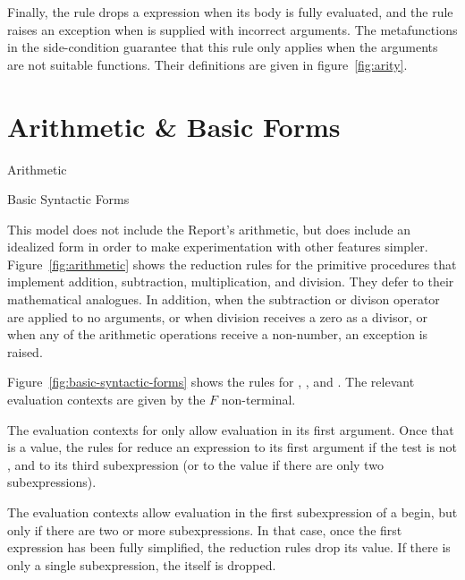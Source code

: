 Finally, the rule  drops a  expression
when its body is fully evaluated, and the rule 
raises an exception when  is supplied with
incorrect arguments.  The metafunctions in the side-condition
guarantee that this rule only applies when the arguments are not
suitable functions. Their definitions are given in
figure~\ref{fig:arity}.

\section{Arithmetic \& Basic Forms}

\beginfig
\begin{center}

\end{center}
\caption{Arithmetic}\label{fig:arithmetic}
\endfig

\beginfig
\begin{center}

\end{center}
\caption{Basic Syntactic Forms}\label{fig:basic-syntactic-forms}
\endfig

This model does not include the Report's arithmetic, but does include
an idealized form in order to make experimentation with other features
simpler. Figure~\ref{fig:arithmetic} shows the reduction rules for the
primitive procedures that implement addition, subtraction,
multiplication, and division. They defer to their mathematical
analogues. In addition, when the subtraction or divison operator are
applied to no arguments, or when division receives a zero as a
divisor, or when any of the arithmetic operations receive a
non-number, an exception is raised.

Figure~\ref{fig:basic-syntactic-forms} shows the rules for
, , and . The relevant
evaluation contexts are given by the $F$ non-terminal.

The evaluation contexts for  only allow evaluation in its
first argument. Once that is a value, the rules for  reduce
an  expression to its first argument if the test is not
\semfalse{}, and to its third subexpression (or to the value
 if there are only two subexpressions).

The  evaluation contexts allow evaluation in the first
subexpression of a begin, but only if there are two or more
subexpressions. In that case, once the first expression has been fully
simplified, the reduction rules drop its value. If there is only a
single subexpression, the  itself is dropped.

